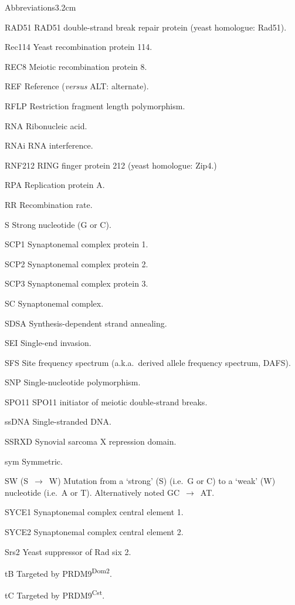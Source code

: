 \begin{mclistof}{Abbreviations}{3.2cm}
\item[RAD51] RAD51 double-strand break repair protein (yeast homologue: Rad51).
\item[Rec114] Yeast recombination protein 114.
\item[REC8] Meiotic recombination protein 8.
\item[REF] Reference (\textit{versus} ALT\@: alternate).
\item[RFLP] Restriction fragment length polymorphism.
\item[RNA] Ribonucleic acid.
\item[RNAi] RNA interference.
\item[RNF212] RING finger protein 212 (yeast homologue: Zip4.)
\item[RPA] Replication protein A\@.
\item[RR] Recombination rate.
\item[S] Strong nucleotide (G or C).
\item[SCP1] Synaptonemal complex protein 1.
\item[SCP2] Synaptonemal complex protein 2.
\item[SCP3] Synaptonemal complex protein 3.
\item[SC] Synaptonemal complex.
\item[SDSA] Synthesis-dependent strand annealing.
\item[SEI] Single-end invasion.
\item[SFS] Site frequency spectrum (a.k.a.\ derived allele frequency spectrum, DAFS).
\item[SNP] Single-nucleotide polymorphism.
\item[SPO11] SPO11 initiator of meiotic double-strand breaks.
\item[ssDNA] Single-stranded DNA\@.
\item[SSRXD] Synovial sarcoma X repression domain.
\item[sym] Symmetric.
\item[SW (S~$\rightarrow$~W)] Mutation from a ‘strong’ (S) (i.e.\ G or C) to a ‘weak’ (W) nucleotide (i.e.\ A or T). Alternatively noted GC~$\rightarrow$~AT\@.
\item[SYCE1] Synaptonemal complex central element 1.
\item[SYCE2] Synaptonemal complex central element 2.
\item[Srs2] Yeast suppressor of Rad six 2.
\item[tB] Targeted by PRDM9\textsuperscript{Dom2}.
\item[tC] Targeted by PRDM9\textsuperscript{Cst}.

\end{mclistof}
